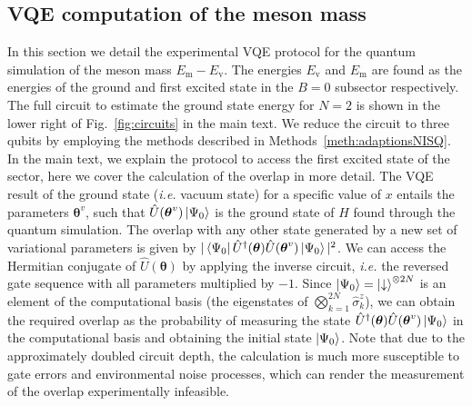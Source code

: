 \documentclass[twocolumn,aps,showpacs,prb,superscriptaddress,floatfix,10pt,nofootinbib]{revtex4-2}
\begin{document}
\subsection{VQE computation of the meson mass}
\label{meth:mesonVQE}
In this section we detail the experimental VQE protocol for the quantum simulation of the meson mass $E_\text{m} - E_\text{v}$. The energies $E_\text{v}$ and $E_\text{m}$ are found as the energies of the ground and first excited state in the $B=0$ subsector respectively. 
The full circuit to estimate the ground state energy for $N=2$ is shown in the lower right of Fig.~\ref{fig:circuits} in the main text. 
We reduce the circuit to three qubits by employing the methods described in Methods~\ref{meth:adaptionsNISQ}. In the main text, we explain the protocol to access the first excited state of the sector, here we cover the calculation of the overlap in more detail.
The VQE result of the ground state (\textit{i.e.} vacuum state) for a specific value of $x$ entails the parameters $\boldsymbol{\theta}^v$, such that $\hat{U}(\boldsymbol{\theta}^v)\ket{\Psi_0}$ is the ground state of $\hat{H}$ found through the quantum simulation. 
The overlap with any other state generated by a new set of variational parameters is given by $|\bra{\Psi_0}\hat{U}^\dagger(\boldsymbol{\theta})\hat{U}(\boldsymbol{\theta}^v)\ket{\Psi_0}|^2$. 
We can access the Hermitian conjugate of $\hat{U}(\boldsymbol{\theta})$ by applying the inverse circuit, \textit{i.e.} the reversed gate sequence with all parameters multiplied by $-1$. 
Since $\ket{\Psi_0}=\ket{\downarrow}^{\otimes 2N}$ is an element of the computational basis (the eigenstates of $\bigotimes_{k=1}^{2N}\hat{\sigma}^z_k$), we can obtain the required overlap as the probability of measuring the state $\hat{U}^\dagger(\boldsymbol{\theta})\hat{U}(\boldsymbol{\theta}^v)\ket{\Psi_0}$ in the computational basis and obtaining the initial state $\ket{\Psi_0}$.
Note that due to the approximately doubled circuit depth, the calculation is much more susceptible to gate errors and environmental noise processes, which can render the measurement of the overlap experimentally infeasible.
\end{document}
